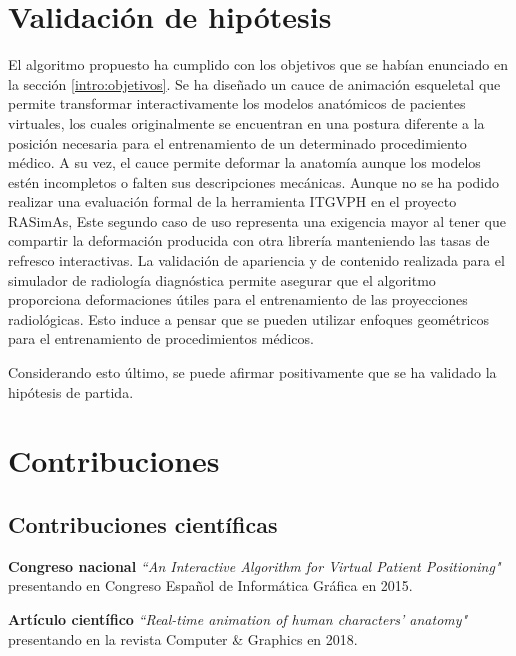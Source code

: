 \section{Validación de hipótesis}
\label{conclu:hipotesis}

El algoritmo propuesto ha cumplido con los objetivos que se habían enunciado en la sección \ref{intro:objetivos}. Se ha diseñado un cauce de animación esqueletal que permite transformar interactivamente los modelos anatómicos de pacientes virtuales, los cuales originalmente se encuentran en una postura diferente a la posición necesaria para el entrenamiento de un determinado procedimiento médico. A su vez, el cauce permite deformar la anatomía aunque los modelos estén incompletos o falten sus descripciones mecánicas. Aunque no se ha podido realizar una evaluación formal de la herramienta \ac{ITGVPH} en el proyecto \ac{RASimAs}, 
Este segundo caso de uso representa una exigencia mayor al tener que compartir la deformación producida con otra librería manteniendo las tasas de refresco interactivas. La validación de apariencia y de contenido realizada para el simulador de radiología diagnóstica permite asegurar que el algoritmo proporciona deformaciones útiles para el entrenamiento de las proyecciones radiológicas.
Esto induce a pensar que se pueden utilizar enfoques geométricos para el entrenamiento de procedimientos médicos.

Considerando esto último, se puede afirmar positivamente que se ha validado la hipótesis de partida.




\section{Contribuciones}
\subsection{Contribuciones científicas}
\label{conclu:cientifica}

\textbf{Congreso nacional } \emph{``An Interactive Algorithm for Virtual Patient Positioning"} \cite{ceig.20151197} presentando en Congreso Español de Informática Gráfica en 2015. 

\textbf{Artículo científico }\emph{``Real-time animation of human characters' anatomy"}\cite{SUJAR2018268} presentando en la revista Computer \& Graphics en 2018. 

